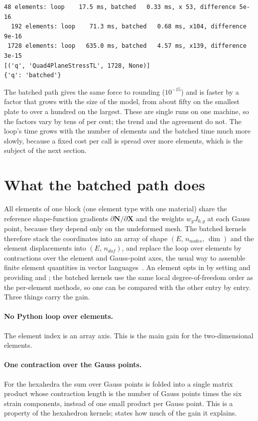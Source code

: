 \begin{lstlisting}[numbers=none,language={},keywordstyle={},commentstyle={},frame=single,aboveskip=2pt]
   48 elements: loop    17.5 ms, batched   0.33 ms, x 53, difference 5e-16
  192 elements: loop    71.3 ms, batched   0.68 ms, x104, difference 9e-16
 1728 elements: loop   635.0 ms, batched   4.57 ms, x139, difference 3e-15
[('q', 'Quad4PlaneStressTL', 1728, None)]
{'q': 'batched'}
\end{lstlisting}

The batched path gives the same force to rounding ($10^{-15}$) and is faster by a factor that grows with the size of the model, from about fifty on the smallest plate to over a hundred on the largest. These are single runs on one machine, so the factors vary by tens of per cent; the trend and the agreement do not. The loop's time grows with the number of elements and the batched time much more slowly, because a fixed cost per call is spread over more elements, which is the subject of the next section.

\section{What the batched path does}\label{sec:bk-idea}

All elements of one block (one element type with one material) share the reference shape-function gradients $\partial\bm N/\partial\bm X$ and the weights $w_gJ_{0,g}$ at each Gauss point, because they depend only on the undeformed mesh. The batched kernels therefore stack the coordinates into an array of shape $(E,\,n_{nodes},\,\dim)$ and the element displacements into $(E,\,n_{dof})$, and replace the loop over elements by contractions over the element and Gauss-point axes, the usual way to assemble finite element quantities in vector languages~\cite{cuvelier2014assemble}. An element opts in by setting  and providing  and ; the batched kernels use the same local degree-of-freedom order as the per-element methods, so one can be compared with the other entry by entry. Three things carry the gain.

\paragraph{No Python loop over elements.} The element index is an array axis. This is the main gain for the two-dimensional elements.

\paragraph{One contraction over the Gauss points.} For the hexahedra the sum over Gauss points is folded into a single matrix product whose contraction length is the number of Gauss points times the six strain components, instead of one small product per Gauss point. This is a property of the hexahedron kernels;  states how much of the gain it explains.

